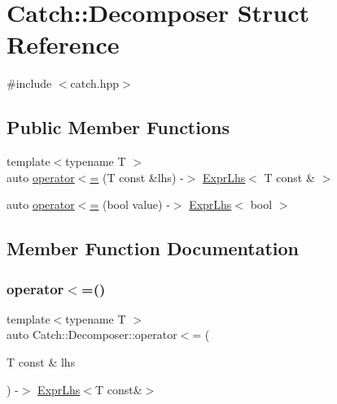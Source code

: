 \hypertarget{struct_catch_1_1_decomposer}{}\section{Catch\+::Decomposer Struct Reference}
\label{struct_catch_1_1_decomposer}


{\ttfamily \#include $<$catch.\+hpp$>$}

\subsection*{Public Member Functions}
\begin{DoxyCompactItemize}
\item 
{\footnotesize template$<$typename T $>$ }\\auto \mbox{\hyperlink{struct_catch_1_1_decomposer_a4b1e5e844c20e5a90e3d759d216674cd}{operator$<$=}} (T const \&lhs) -\/$>$ \mbox{\hyperlink{class_catch_1_1_expr_lhs}{Expr\+Lhs}}$<$ T const \& $>$
\item 
auto \mbox{\hyperlink{struct_catch_1_1_decomposer_aac129b94903ae1339d5709049d83613b}{operator$<$=}} (bool value) -\/$>$ \mbox{\hyperlink{class_catch_1_1_expr_lhs}{Expr\+Lhs}}$<$ bool $>$
\end{DoxyCompactItemize}


\subsection{Member Function Documentation}
\mbox{\label{struct_catch_1_1_decomposer_a4b1e5e844c20e5a90e3d759d216674cd}} 
\subsubsection{\texorpdfstring{operator$<$=()}{operator<=()}\hspace{0.1cm}{\footnotesize\ttfamily [1/2]}}
{\footnotesize\ttfamily template$<$typename T $>$ \\
auto Catch\+::\+Decomposer\+::operator$<$= (\begin{DoxyParamCaption}\item[{T const \&}]{lhs }\end{DoxyParamCaption}) -\/$>$ \mbox{\hyperlink{class_catch_1_1_expr_lhs}{Expr\+Lhs}}$<$T const\&$>$ \hspace{0.3cm}{\ttfamily [inline]}}

